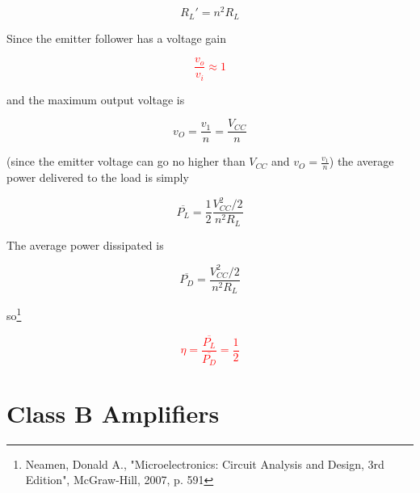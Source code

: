 \begin{equation}
R_{L}' = n^{2}R_{L}
\end{equation}

Since the emitter follower has a voltage gain

\textcolor{red}{
\begin{equation}
\frac{v_{o}}{v_{i}} \approx 1
\end{equation}
}

and the maximum output voltage is

\begin{equation}
v_{O} = \frac{v_{1}}{n} = \frac{V_{CC}}{n}
\end{equation}

(since the emitter voltage can go no higher than $V_{CC}$ and $v_{O} = \frac{v_{1}}{n}$) the average power delivered to the load is simply

\begin{equation}
\overline{P_{L}} = \frac{1}{2}\frac{V_{CC}^{2}/2}{n^{2}R_{L}}
\end{equation}

The average power dissipated is

\begin{equation}
\overline{P_{D}} = \frac{V_{CC}^{2}/2}{n^{2}R_{L}}
\end{equation}

so\footnote{Neamen, Donald A., "Microelectronics: Circuit Analysis and Design, 3rd Edition", McGraw-Hill, 2007, p. 591}

\textcolor{red}{
\begin{equation}
\eta = \frac{\overline{P_{L}}}{\overline{P_{D}}} = \frac{1}{2}
\end{equation}
}

\section{Class B Amplifiers}

